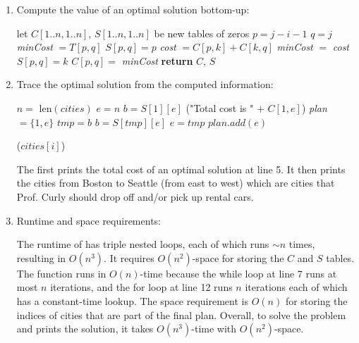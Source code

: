 \documentclass[11pt]{article}
\theoremstyle{definition}
\theoremstyle{theorem}
\begin{document}
\begin{enumerate}[label=(\arabic*)]
\item Compute the value of an optimal solution bottom-up:

\begin{algorithmic}[1]
	\State let $C[1..n, 1..n]$, $S[1..n, 1..n]$ be new tables of zeros 
			\State $p = j - i - 1$
			\State $q = j$
			\State \textit{minCost } $= T[p, q]$ 
			\State $S[p, q] = p$
				\State \textit{cost} $= C[p, k] + C[k, q]$
					\State \textit{minCost} $ = $ \textit{cost}
					\State $S[p, q] = k$
				\EndIf 
				\State $C[p, q] = $ \textit{minCost}
			\EndFor
		\EndFor
	\EndFor
	\State \textbf{return} $C$, $S$
\EndFunction
\end{algorithmic}

\item Trace the optimal solution from the computed information:
\begin{algorithmic}[1]
	\State $n =$ len$(\textit{cities})$
	\State $e = n$ 
	\State $b = S[1][e]$ 
	\State {}("Total cost is " + $C[1, e]$)
	\State \textit{plan} $= \{1, e\}$ 
	 
		\State $\textit{tmp} = b$
		\State $b = S[\textit{tmp}][e]$
		\State $e = tmp$
		\State $\textit{plan}.\textit{add}(e)$	
	\EndWhile
	
			\State {}($\textit{cities}[i]$)
		\EndIf 
	\EndFor
\EndFunction
\end{algorithmic}
The  first prints the total cost of an optimal solution at line 5. It then prints the cities from Boston to Seattle (from east to west) which are cities that Prof. Curly should drop off and/or pick up rental cars. 

\item Runtime and space requirements:

The runtime of  has triple nested loops, each of which runs $\sim n$ times, resulting in $O(n^3)$. It requires $O(n^2)$-space for storing the $C$ and $S$ tables. The function  runs in $O(n)$-time because the while loop at line 7 runs at most $n$ iterations, and the for loop at line 12 runs $n$ iterations each of which has a constant-time lookup. The space requirement is $O(n)$ for storing the indices of cities that are part of the final plan. Overall, to solve the problem and prints the solution, it takes $O(n^3)$-time with $O(n^2)$-space.

\end{enumerate}
\end{document}
